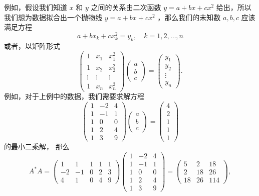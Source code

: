 例如，假设我们知道 $x$ 和 $y$ 之间的关系由二次函数 $y = a + bx + cx^2$ 给出，所以我们想为数据拟合出一个抛物线 $y = a + bx + cx^2$ ，那么我们的未知数 $a, b, c$ 应该满足方程
$$a + bx_k + cx_k^2 = y_k, \quad k = 1, 2, \dots, n$$
或者，以矩阵形式
$$\begin{pmatrix} 1 & x_1 & x_1^2 \\ 1 & x_2 & x_2^2 \\ \vdots & \vdots & \vdots \\ 1 & x_n & x_n^2 \end{pmatrix} \begin{pmatrix} a \\ b \\ c \end{pmatrix} = \begin{pmatrix} y_1 \\ y_2 \\ \vdots \\ y_n \end{pmatrix}.$$
例如，对于上例中的数据，我们需要求解方程
$$\begin{pmatrix} 1 & -2 & 4 \\ 1 & -1 & 1 \\ 1 & 0 & 0 \\ 1 & 2 & 4 \\ 1 & 3 & 9 \end{pmatrix} \begin{pmatrix} a \\ b \\ c \end{pmatrix} = \begin{pmatrix} 4 \\ 2 \\ 1 \\ 1 \\ 1 \end{pmatrix}$$
的最小二乘解，
那么
$$A^*A = \begin{pmatrix} 1 & 1 & 1 & 1 & 1 \\ -2 & -1 & 0 & 2 & 3 \\ 4 & 1 & 0 & 4 & 9 \end{pmatrix} \begin{pmatrix} 1 & -2 & 4 \\ 1 & -1 & 1 \\ 1 & 0 & 0 \\ 1 & 2 & 4 \\ 1 & 3 & 9 \end{pmatrix} = \begin{pmatrix} 5 & 2 & 18 \\ 2 & 18 & 26 \\ 18 & 26 & 114 \end{pmatrix},$$
